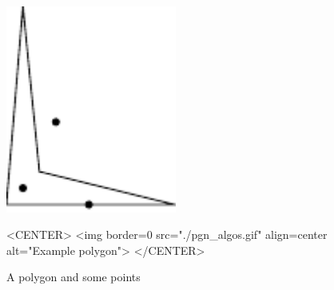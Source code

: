 \begin{figure}
\begin{ccTexOnly}
\includegraphics[width=0.5\textwidth]{Polygon/pgn_algos}
\end{ccTexOnly}
\begin{ccHtmlOnly}
<CENTER>
<img border=0 src="./pgn_algos.gif" align=center alt="Example polygon">
</CENTER>
\end{ccHtmlOnly}
\caption{A polygon and some points
\label{I1_Fig_a_polygon}}
\end{figure}

